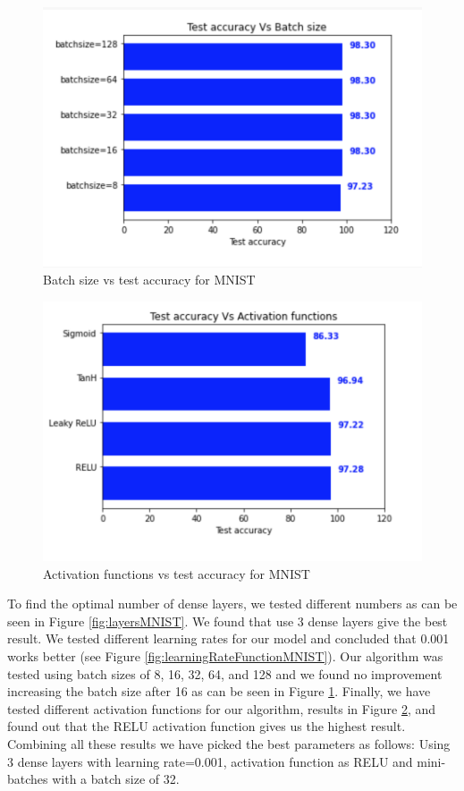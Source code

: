 \documentclass[conference]{IEEEtran}
\begin{document}
\begin{figure}[H]
\centering
\includegraphics[scale = 0.50]{figs/batchsize_MNIST.png}
\caption{Batch size vs test accuracy for MNIST}
\label{fig:batchsizeMNIST}
\end{figure}

\begin{figure}[H]
\centering
\includegraphics[scale = 0.50]{figs/activationFunctions_MNIST.png}
\caption{Activation functions vs test accuracy for MNIST}
\label{fig:activationFunctionsMNIST}
\end{figure}

To find the optimal number of dense layers, we tested different numbers as can be seen in Figure \ref{fig:layersMNIST}. We found that use 3 dense layers give the best result. We tested different learning rates for our model and concluded that 0.001 works better (see Figure \ref{fig:learningRateFunctionMNIST}). Our algorithm was tested using batch sizes of 8, 16, 32, 64, and 128 and we found no improvement increasing the batch size after 16 as can be seen in Figure \ref{fig:batchsizeMNIST}. Finally, we have tested different activation functions for our algorithm, results in Figure \ref{fig:activationFunctionsMNIST}, and found out that the RELU activation function gives us the highest result. Combining all these results we have picked the best parameters as follows: Using 3 dense layers with learning rate=0.001, activation function as RELU and mini-batches with a batch size of 32. 
\end{document}
